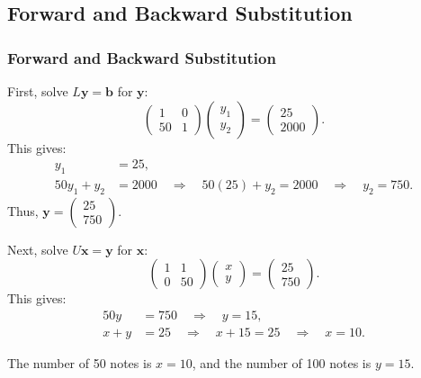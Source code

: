 \documentclass{beamer}
\theoremstyle{remark}
\numberwithin{equation}{section}
\begin{document}
	
	\subsection{Forward and Backward Substitution}
	\begin{frame}[allowframebreaks]
		\frametitle{Forward and Backward Substitution}
		First, solve \(L \mathbf{y} = \mathbf{b}\) for \(\mathbf{y}\):
		\[
		\begin{pmatrix} 1 & 0 \\ 50 & 1 \end{pmatrix} \begin{pmatrix} y_1 \\ y_2 \end{pmatrix} = \begin{pmatrix} 25 \\ 2000 \end{pmatrix}.
		\]
		This gives:
		\begin{align}
			y_1 &= 25, \\
			50y_1 + y_2 &= 2000 \quad \Rightarrow \quad 50(25) + y_2 = 2000 \quad \Rightarrow \quad y_2 = 750.
		\end{align}
		Thus, \(\mathbf{y} = \begin{pmatrix} 25 \\ 750 \end{pmatrix}\).
		
		Next, solve \(U \mathbf{x} = \mathbf{y}\) for \(\mathbf{x}\):
		\[
		\begin{pmatrix} 1 & 1 \\ 0 & 50 \end{pmatrix} \begin{pmatrix} x \\ y \end{pmatrix} = \begin{pmatrix} 25 \\ 750 \end{pmatrix}.
		\]
		This gives:
		\begin{align}
			50y &= 750 \quad \Rightarrow \quad y = 15, \\
			x + y &= 25 \quad \Rightarrow \quad x + 15 = 25 \quad \Rightarrow \quad x = 10.
		\end{align}
		
		The number of 50 notes is \(x = 10\), and the number of 100 notes is \(y = 15\).
	\end{frame}
	
	
\end{document}

